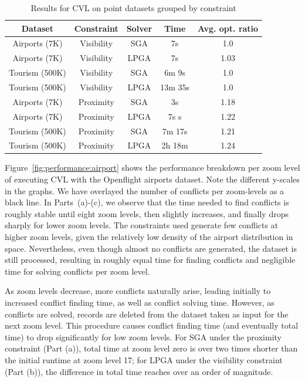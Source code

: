\begin{table}[htdp]
\caption{Results for CVL on point datasets grouped by constraint}
\begin{center}
\begin{tabular}{|c|c|c|c|c|}
\hline
\textbf{Dataset} & \textbf{Constraint} & \textbf{Solver} & \textbf{Time} & \textbf{Avg. opt. ratio}\\ 
\hline
Airports (7K) & Visibility & SGA & 7s & 1.0 \\
Airports (7K) & Visibility & LPGA & 7s & 1.03 \\
Tourism (500K) & Visibility & SGA & 6m 9s & 1.0 \\
Tourism (500K) & Visibility & LPGA & 13m 35s & 1.0 \\
\hline
Airports (7K)  & Proximity  & SGA & 3s & 1.18 \\
Airports (7K)  & Proximity & LPGA & 7s s & 1.22 \\
Tourism (500K) & Proximity & SGA & 7m 17s & 1.21 \\
Tourism (500K) & Proximity & LPGA & 2h 18m & 1.24 \\
\hline
\end{tabular}
\end{center}
\label{tab:points:overview}
\end{table}%

Figure~\ref{fig:performance:airport} shows the performance breakdown per zoom level of executing CVL with the Openflight airports dataset. Note the different y-scales in the graphs. We have overlayed the number of conflicts per zoom-levels as a black line. In Parts~(a)-(c), we observe that the time needed to find conflicts is roughly stable until eight zoom levels, then slightly increases, and finally drops sharply for lower zoom levels. The constraints used generate few conflicts at higher zoom levels, given the relatively low density of the airport distribution in space. Nevertheless, even though almost no conflicts are generated, the dataset is still processed, resulting in roughly equal time for finding conflicts and negligible time for solving conflicts per zoom level. 
 
As zoom levels decrease, more conflicts naturally arise, leading initially to increased conflict finding time, as well as conflict solving time. However, as conflicts are solved, records are deleted from the dataset taken as input for the next zoom level. This procedure causes conflict finding time (and eventually total time) to drop significantly for low zoom levels. For SGA under the proximity constraint (Part (a)), total time at zoom level zero is over two times shorter than the initial runtime at zoom level 17; for LPGA under the visibility constraint (Part (b)), the difference in total time reaches over an order of magnitude.  

